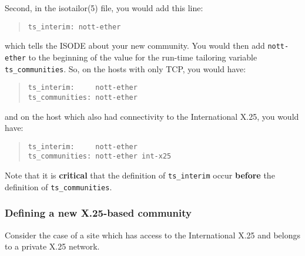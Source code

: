 Second,
in the \man isotailor(5) file, you would add this line:
\begin{quote}\small\begin{verbatim}
ts_interim: nott-ether
\end{verbatim}\end{quote}
which tells the ISODE about your new community.
You would then add \verb"nott-ether" to the beginning of the value for the
run-time tailoring variable \verb"ts_communities".
So,
on the hosts with only TCP, you would have:
\begin{quote}\small\begin{verbatim}
ts_interim:     nott-ether
ts_communities: nott-ether
\end{verbatim}\end{quote}
and on the host which also had connectivity to the International X.25,
you would have:
\begin{quote}\small\begin{verbatim}
ts_interim:     nott-ether
ts_communities: nott-ether int-x25
\end{verbatim}\end{quote}
Note that it is {\bf critical\/} that the definition of \verb"ts_interim"
occur {\bf before\/} the definition of \verb"ts_communities".

\subsubsection	{Defining a new X.25-based community}
Consider the case of a site which has access to the International X.25 and
belongs to a private X.25 network.

